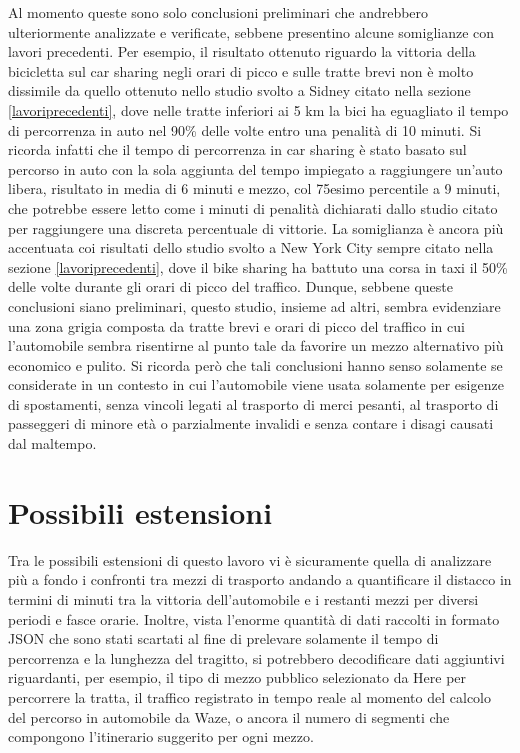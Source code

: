 Al momento queste sono solo conclusioni preliminari che andrebbero ulteriormente analizzate e verificate, sebbene presentino alcune somiglianze con lavori precedenti. Per esempio, il risultato ottenuto riguardo la vittoria della bicicletta sul car sharing negli orari di picco e sulle tratte brevi non è molto dissimile da quello ottenuto nello studio svolto a Sidney citato nella sezione \ref{lavoriprecedenti}, dove nelle tratte inferiori ai 5 km la bici ha eguagliato il tempo di percorrenza in auto nel 90\% delle volte entro una penalità di 10 minuti. Si ricorda infatti che il tempo di percorrenza in car sharing è stato basato sul percorso in auto con la sola aggiunta del tempo impiegato a raggiungere un'auto libera, risultato in media di 6 minuti e mezzo, col 75esimo percentile a 9 minuti, che potrebbe essere letto come i minuti di penalità dichiarati dallo studio citato per raggiungere una discreta percentuale di vittorie. La somiglianza è ancora più accentuata coi risultati dello studio svolto a New York City sempre citato nella sezione \ref{lavoriprecedenti}, dove il bike sharing ha battuto una corsa in taxi il 50\% delle volte durante gli orari di picco del traffico. Dunque, sebbene queste conclusioni siano preliminari, questo studio, insieme ad altri, sembra evidenziare una zona grigia composta da tratte brevi e orari di picco del traffico in cui l'automobile sembra risentirne al punto tale da favorire un mezzo alternativo più economico e pulito. Si ricorda però che tali conclusioni hanno senso solamente se considerate in un contesto in cui l'automobile viene usata solamente per esigenze di spostamenti, senza vincoli legati al trasporto di merci pesanti, al trasporto di passeggeri di minore età o parzialmente invalidi e senza contare i disagi causati dal maltempo.

\section{Possibili estensioni}

Tra le possibili estensioni di questo lavoro vi è sicuramente quella di analizzare più a fondo i confronti tra mezzi di trasporto andando a quantificare il distacco in termini di minuti tra la vittoria dell'automobile e i restanti mezzi per diversi periodi e fasce orarie. Inoltre, vista l'enorme quantità di dati raccolti in formato JSON che sono stati scartati al fine di prelevare solamente il tempo di percorrenza e la lunghezza del tragitto, si potrebbero decodificare dati aggiuntivi riguardanti, per esempio, il tipo di mezzo pubblico selezionato da Here per percorrere la tratta, il traffico registrato in tempo reale al momento del calcolo del percorso in automobile da Waze, o ancora il numero di segmenti che compongono l'itinerario suggerito per ogni mezzo.

